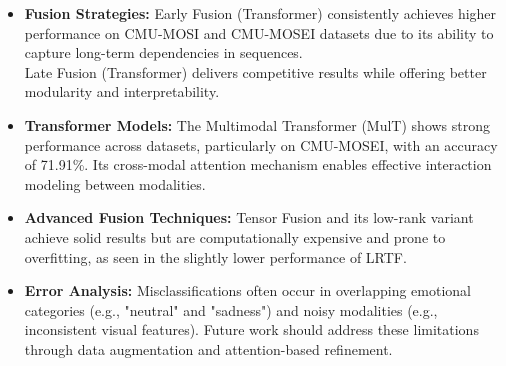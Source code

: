 \documentclass{article}
\begin{document}
\begin{itemize}
    \item \textbf{Fusion Strategies:} Early Fusion (Transformer) consistently achieves higher performance on CMU-MOSI and CMU-MOSEI datasets due to its ability to capture long-term dependencies in sequences.\\
    Late Fusion (Transformer) delivers competitive results while offering better modularity and interpretability.\\

    \item \textbf{Transformer Models:} 
    The Multimodal Transformer (MulT) shows strong performance across datasets, particularly on CMU-MOSEI, with an accuracy of 71.91\%. Its cross-modal attention mechanism enables effective interaction modeling between modalities.\\
    
    \item \textbf{Advanced Fusion Techniques:} 
    Tensor Fusion and its low-rank variant achieve solid results but are computationally expensive and prone to overfitting, as seen in the slightly lower performance of LRTF.\\
    
    \item \textbf{Error Analysis:}
    Misclassifications often occur in overlapping emotional categories (e.g., "neutral" and "sadness") and noisy modalities (e.g., inconsistent visual features). Future work should address these limitations through data augmentation and attention-based refinement.
\end{itemize}

\begin{table*}[h]
\centering
{}
\captionsetup{margin=10pt,font=small,labelfont=bf}
\caption{Performance of various architectures across datasets.}
\label{model-performance}
\end{table*}
\end{document}
